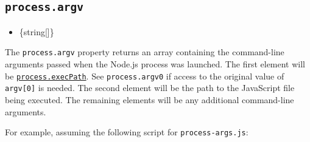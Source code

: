\begin{Shaded}
\begin{Highlighting}[]
 \OperatorTok{;}

\NormalTok{(}\SpecialCharTok{$\{}\SpecialCharTok{\}}\VerbatimStringTok{\textasciigrave{}}\NormalTok{)}\OperatorTok{;}
\end{Highlighting}
\end{Shaded}

\begin{Shaded}
\begin{Highlighting}[]
\OperatorTok{=} \NormalTok{(}\NormalTok{)}\OperatorTok{;}

\NormalTok{(}\SpecialCharTok{$\{}\SpecialCharTok{\}}\VerbatimStringTok{\textasciigrave{}}\NormalTok{)}\OperatorTok{;}
\end{Highlighting}
\end{Shaded}

\subsection{\texorpdfstring{\texttt{process.argv}}{process.argv}}\label{process.argv}

\begin{itemize}
\tightlist
\item
  \{string{[}{]}\}
\end{itemize}

The \texttt{process.argv} property returns an array containing the
command-line arguments passed when the Node.js process was launched. The
first element will be
\hyperref[processexecpath]{\texttt{process.execPath}}. See
\texttt{process.argv0} if access to the original value of
\texttt{argv{[}0{]}} is needed. The second element will be the path to
the JavaScript file being executed. The remaining elements will be any
additional command-line arguments.

For example, assuming the following script for \texttt{process-args.js}:

